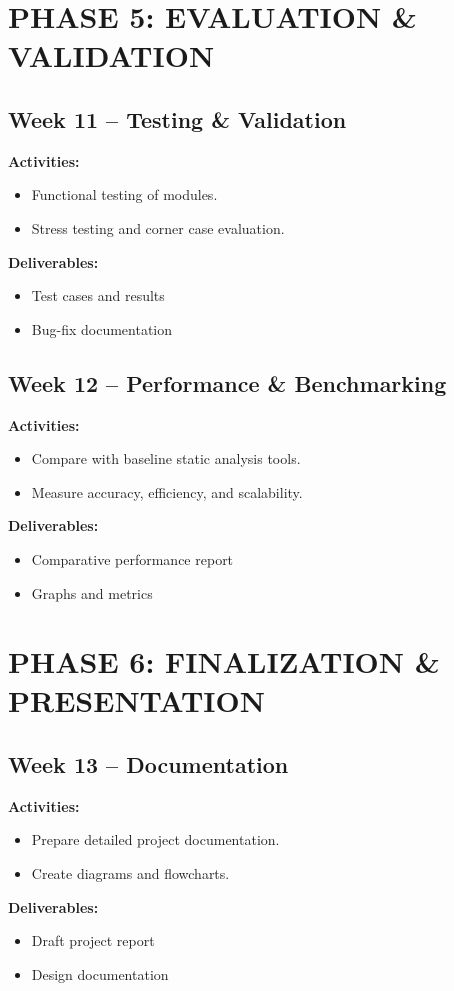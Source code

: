 \documentclass[12pt,a4paper]{article}
\begin{document}
\section*{PHASE 5: EVALUATION \& VALIDATION}

\subsection*{Week 11 -- Testing \& Validation}
\textbf{Activities:}
\begin{itemize}[noitemsep]
    \item Functional testing of modules.
    \item Stress testing and corner case evaluation.
\end{itemize}
\textbf{Deliverables:}
\begin{itemize}[noitemsep]
    \item Test cases and results
    \item Bug-fix documentation
\end{itemize}

\subsection*{Week 12 -- Performance \& Benchmarking}
\textbf{Activities:}
\begin{itemize}[noitemsep]
    \item Compare with baseline static analysis tools.
    \item Measure accuracy, efficiency, and scalability.
\end{itemize}
\textbf{Deliverables:}
\begin{itemize}[noitemsep]
    \item Comparative performance report
    \item Graphs and metrics
\end{itemize}

\section*{PHASE 6: FINALIZATION \& PRESENTATION}

\subsection*{Week 13 -- Documentation}
\textbf{Activities:}
\begin{itemize}[noitemsep]
    \item Prepare detailed project documentation.
    \item Create diagrams and flowcharts.
\end{itemize}
\textbf{Deliverables:}
\begin{itemize}[noitemsep]
    \item Draft project report
    \item Design documentation
\end{itemize}
\end{document}
